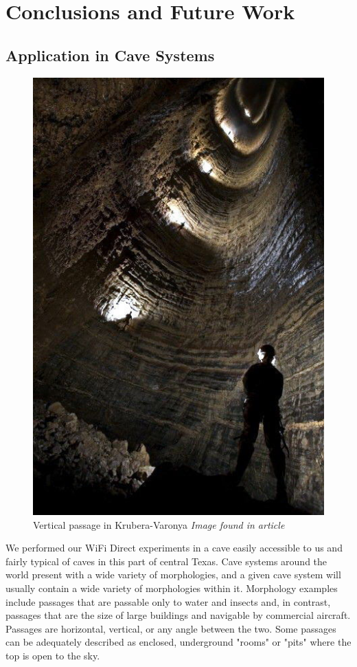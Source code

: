 \documentclass[10pt,twocolumn]{article}
\begin{document}
\section{Conclusions and Future Work}

\subsection{Application in Cave Systems}
\label{sec:Application in Cave Systems}
\begin{figure}
\includegraphics[width=\columnwidth]{krubera_pit_dark}
\caption{Vertical passage in Krubera-Varonya \textit{Image found in article \cite{krub_blaze}}}
\end{figure}
We performed our WiFi Direct experiments in a cave easily accessible to us and fairly typical of caves in this part of central Texas.
Cave systems around the world present with a wide variety of morphologies, and a given cave system will usually contain a wide variety of morphologies within it.
Morphology examples include passages that are passable only to water and insects and, in contrast, passages that are the size of large buildings and navigable by commercial aircraft.
Passages are horizontal, vertical, or any angle between the two.
Some passages can be adequately described as enclosed, underground "rooms" or "pits" where the top is open to the sky.
\end{document}

